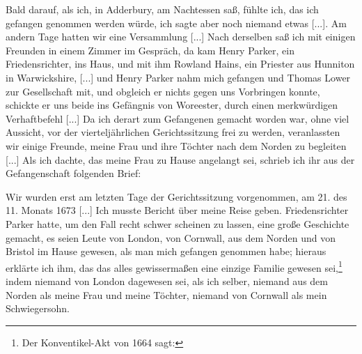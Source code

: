 Bald darauf, als ich, in Adderbury, am Nachtessen saß, fühlte
ich, das ich gefangen genommen werden würde, ich sagte aber noch
niemand etwas [...]. Am andern Tage hatten wir eine Versammlung 
[...] Nach derselben saß ich mit einigen Freunden in einem
Zimmer im Gespräch, da kam Henry Parker, 
ein Friedensrichter, ins Haus, und mit ihm Rowland 
Hains, ein Priester aus Hunniton
in Warwickshire, [...] und Henry Parker nahm mich gefangen und
Thomas Lower zur Gesellschaft 
mit, und obgleich er nichts gegen
uns Vorbringen konnte, schickte er uns beide ins Gefängnis von
Woreester, durch einen merkwürdigen Verhaftbefehl [...]
Da ich derart zum Gefangenen gemacht worden war, ohne viel
Aussicht, vor der vierteljährlichen Gerichtssitzung frei zu werden,
veranlassten wir einige Freunde, meine Frau und ihre Töchter
nach dem Norden zu begleiten [...] Als ich dachte, das meine
Frau zu Hause angelangt sei, schrieb ich ihr aus der Gefangenschaft 
folgenden Brief:



Wir wurden erst am letzten Tage der Gerichtssitzung 
vorgenommen, am 21. des 11. Monats 1673 [...] Ich musste
Bericht über meine Reise geben. Friedensrichter Parker hatte,
um den Fall recht schwer scheinen zu lassen, eine große Geschichte
gemacht, es seien Leute von London, von Cornwall, aus dem
Norden und von Bristol im Hause gewesen, als man mich gefangen 
genommen habe; hieraus erklärte ich ihm, das das alles
gewissermaßen eine einzige Familie gewesen 
sei,\footnote{Der Konventikel-Akt von 1664 sagt: 
} indem niemand von
London dagewesen sei, als ich selber, niemand aus dem Norden als
meine Frau und meine Töchter, niemand von Cornwall als mein
Schwiegersohn.

